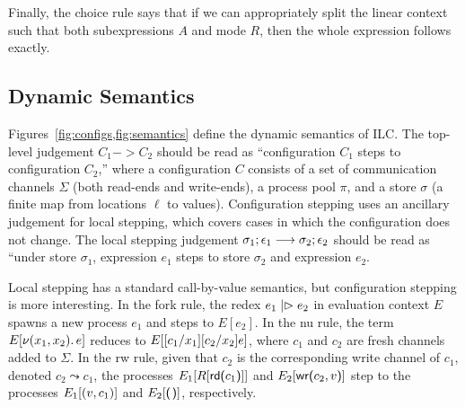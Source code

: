Finally, the choice rule says that if we can appropriately split the linear
context such that both subexpressions $A$ and mode $R$, then the whole
expression follows exactly.

\subsection{Dynamic Semantics}
\label{subsec:semantics}



Figures~\ref{fig:configs,fig:semantics} define the dynamic semantics of ILC. The
top-level judgement $C_1 -> C_2$ should be read as ``configuration $C_1$ steps
to configuration $C_2$,'' where a configuration $C$ consists of a set of
communication channels $\Sigma$ (both read-ends and write-ends), a process pool $\pi$,
and a store $\sigma$ (a finite map from locations $\ell$ to values). Configuration
stepping uses an ancillary judgement for local stepping, which covers cases in
which the configuration does not change.  The local stepping judgement
$\sigma_1; \epsilon_1 \longrightarrow \sigma_2; \epsilon_2$ should be read as ``under store $\sigma_1$, expression $e_1$
steps to store $\sigma_{2}$ and expression $e_2$.

Local stepping has a standard call-by-value semantics, but configuration
stepping is more interesting. In the fork rule, the redex $e_1 \mathrel{|\rhd} e_2$ in
evaluation context $E$ spawns a new process $e_1$ and steps to $E[e_2]$. In the
nu rule, the term $E[ \nu(x_1, x_2).\,e ]$ reduces to $E[
  [c_1/x_1][c_2/x_2]e ]$, where $c_1$ and $c_2$ are fresh
channels added to $\Sigma$. In the rw rule, given that $c_2$ is the corresponding
write channel of $c_1$, denoted $c_2 \leadsto c_1$, the processes $E_1[R[
    \text{\textsf{rd}}\textsf{(}{c_1}\textsf{)}] ]$ and $E_2[ \text{\textsf{wr}}\textsf{(}{c_2},{v}\textsf{)}]$ step to the processes
$E_1[ (v, c_1)]$ and $E_2[ \eUnit]$, respectively. 

%
